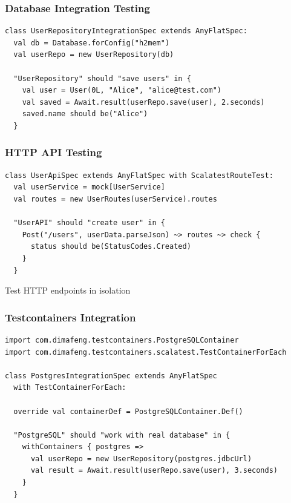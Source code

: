 \documentclass{beamer}
\begin{document}
\begin{frame}[fragile]
\frametitle{Database Integration Testing}

\begin{lstlisting}[style=scalaStyle]
class UserRepositoryIntegrationSpec extends AnyFlatSpec:
  val db = Database.forConfig("h2mem")
  val userRepo = new UserRepository(db)
  
  "UserRepository" should "save users" in {
    val user = User(0L, "Alice", "alice@test.com")
    val saved = Await.result(userRepo.save(user), 2.seconds)
    saved.name should be("Alice")
  }
\end{lstlisting}

\end{frame}

\begin{frame}[fragile]
\frametitle{HTTP API Testing}

\begin{lstlisting}[style=scalaStyle]
class UserApiSpec extends AnyFlatSpec with ScalatestRouteTest:
  val userService = mock[UserService]
  val routes = new UserRoutes(userService).routes
  
  "UserAPI" should "create user" in {
    Post("/users", userData.parseJson) ~> routes ~> check {
      status should be(StatusCodes.Created)
    }
  }
\end{lstlisting}

Test HTTP endpoints in isolation

\end{frame}

\begin{frame}[fragile]
\frametitle{Testcontainers Integration}

\begin{lstlisting}[style=scalaStyle]
import com.dimafeng.testcontainers.PostgreSQLContainer
import com.dimafeng.testcontainers.scalatest.TestContainerForEach

class PostgresIntegrationSpec extends AnyFlatSpec 
  with TestContainerForEach:
  
  override val containerDef = PostgreSQLContainer.Def()
  
  "PostgreSQL" should "work with real database" in {
    withContainers { postgres =>
      val userRepo = new UserRepository(postgres.jdbcUrl)
      val result = Await.result(userRepo.save(user), 3.seconds)
    }
  }
\end{lstlisting}

\end{frame}
\end{document}
